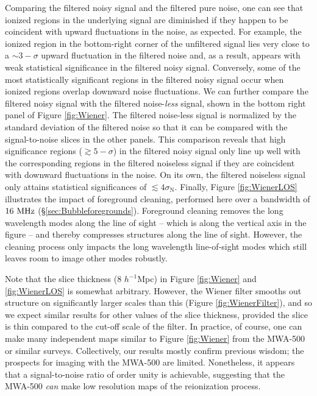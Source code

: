Comparing the filtered noisy signal and the filtered pure noise,
one can see that ionized regions in the underlying signal are
diminished if they happen to be coincident with upward fluctuations 
in the noise, as expected. For example, the ionized region in the
bottom-right corner of the unfiltered signal lies very close to a
$\sim 3-\sigma$ upward fluctuation in the filtered noise and, as a
result, appears with weak statistical significance in the filtered
noisy signal. Conversely, some of the most statistically
significant regions in the filtered noisy signal occur when ionized
regions overlap downward noise fluctuations. 
We can further compare the filtered noisy signal with the filtered noise-{\em less} signal,
shown in the bottom right panel of Figure \ref{fig:Wiener}. The filtered noise-less signal
is normalized by the standard deviation of the filtered noise so that it can be compared
with the signal-to-noise slices in the other panels.
This comparison reveals that high significance regions ($\gtrsim 5-\sigma$) in the 
filtered noisy signal only
line up well with the corresponding regions in the filtered noiseless signal if they
are coincident with downward fluctuations in the noise.
On its own, the filtered noiseless signal only attains statistical significances of $\lesssim4\sigma_{\text{N}}$.
Finally, Figure \ref{fig:WienerLOS} illustrates the impact of
foreground cleaning, performed here over a bandwidth of $16 \ \text{MHz}$ (\S \ref{sec:Bubbleforegrounds}). 
Foreground cleaning removes the long wavelength
modes along the line of sight -- which is along the vertical axis
in the figure -- and thereby compresses structures along the line of sight.
However, the cleaning process only impacts the long wavelength line-of-sight
modes which still leaves room to image other modes robustly.

Note that the slice thickness ($8$ $h^{-1}$Mpc) in Figure \ref{fig:Wiener} and \ref{fig:WienerLOS} is somewhat
arbitrary. However, the Wiener filter smooths out structure on significantly larger
scales than this (Figure \ref{fig:WienerFilter}), and so we expect
similar results for other values of the slice thickness, provided the
slice is thin compared to the cut-off scale of the filter. 
In practice, of course,
one can make many independent maps similar to Figure \ref{fig:Wiener} from
the MWA-500 or similar surveys. Collectively, our results mostly confirm
previous wisdom; the prospects for imaging with the MWA-500 are limited.
Nonetheless, it appears that a signal-to-noise ratio of order unity
is achievable,
suggesting that the MWA-500 {\em can} make low resolution maps of the reionization
process.



